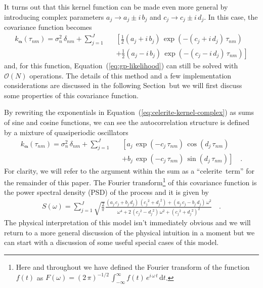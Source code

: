 \documentclass[manuscript, letterpaper]{aastex6}
\newcommand{\project}[1]{\textsf{#1}}
\newcommand{\celerite}{\project{celerite}}
\renewcommand{\eqref}[1]{\ref{eq:#1}}
\newcommand{\Eq}[1]{Equation~(\eqref{#1})}
\newcommand{\eq}[1]{\Eq{#1}}
\newcommand{\eqlabel}[1]{\label{eq:#1}}
\newcommand{\sectionname}{Section}
\newcommand{\dd}{\ensuremath{\,\mathrm{d}}}
\newcommand{\bvec}[1]{{\ensuremath{\boldsymbol{#1}}}}
\begin{document}
It turns out that this kernel function can be made even more general by
introducing complex parameters $a_j \to a_j\pm i\,b_j$ and
$c_j \to c_j\pm i\,d_j$.
In this case, the covariance function becomes
\begin{eqnarray}\eqlabel{celerite-kernel-complex}
k_\bvec{\alpha}(\tau_{nm}) = \sigma_n^2\,\delta_{nm} +
    \sum_{j=1}^J &&\left[
    \frac{1}{2}(a_j + i\,b_j)\,\exp\left(-(c_j+i\,d_j)\,\tau_{nm}\right)
        \right. \nonumber\\
    &&+\left.
    \frac{1}{2}(a_j - i\,b_j)\,\exp\left(-(c_j-i\,d_j)\,\tau_{nm}\right)
\right]
\end{eqnarray}
and, for this function, \eq{gp-likelihood} can still be solved with
$\mathcal{O}(N)$ operations.
The details of this method and a few implementation considerations are
discussed in the following \sectionname\ but we will first discuss some
properties of this covariance function.

By rewriting the exponentials in \eq{celerite-kernel-complex} as sums of sine
and cosine functions, we can see the autocorrelation structure is defined by a
mixture of quasiperiodic oscillators
\begin{eqnarray}\eqlabel{celerite-kernel}
k_\bvec{\alpha}(\tau_{nm}) = \sigma_n^2\,\delta_{nm} +
    \sum_{j=1}^J &&\left[
    a_j\,\exp\left(-c_j\,\tau_{nm}\right)\,\cos\left(d_j\,\tau_{nm}\right)
        \right.\nonumber\\
    &&+ \left.
    b_j\,\exp\left(-c_j\,\tau_{nm}\right)\,\sin\left(d_j\,\tau_{nm}\right)
\right] \quad.
\end{eqnarray}
For clarity, we will refer to the argument within the sum as a ``\celerite\
term'' for the remainder of this paper.
The Fourier transform\footnote{Here and throughout we have defined the Fourier
transform of the function $f(t)$ as $F(\omega)=(2\,\pi)^{-1/2}\,
\int_{-\infty}^\infty f(t)\,e^{i\,\omega\,t}\dd t$.} of this covariance
function is the power spectral density (PSD) of the process and it is given by
\begin{eqnarray}\eqlabel{celerite-psd}
S(\omega) = \sum_{j=1}^J \sqrt{\frac{2}{\pi}}
\frac{(a_j\,c_j+b_j\,d_j)\,({c_j}^2+{d_j}^2)+(a_j\,c_j-b_j\,d_j)\,\omega^2}
{\omega^4+2\,({c_j}^2-{d_j}^2)\,\omega^2+({c_j}^2+{d_j}^2)^2}\quad.
\end{eqnarray}
The physical interpretation of this model isn't immediately obvious and we
will return to a more general discussion of the physical intuition in a moment
but we can start with a discussion of some useful special cases of this model.
\end{document}
